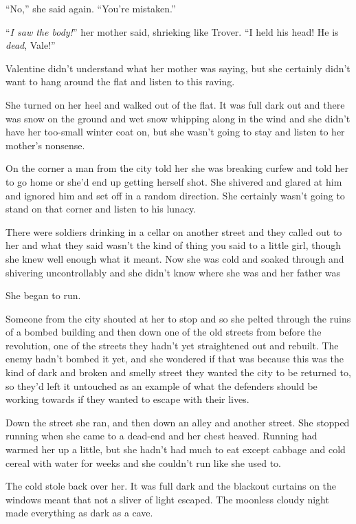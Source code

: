 “No,” she said again. “You’re mistaken.”

“\emph{I saw the body!}” her mother said, shrieking like Trover. “I
held his head! He is \emph{dead}, Vale!”

Valentine didn’t understand what her mother was saying, but she
certainly didn’t want to hang around the flat and listen to this
raving.

She turned on her heel and walked out of the flat. It was full dark
out and there was snow on the ground and wet snow whipping along in
the wind and she didn’t have her too-small winter coat on, but she
wasn’t going to stay and listen to her mother’s nonsense.

On the corner a man from the city told her she was breaking curfew
and told her to go home or she’d end up getting herself shot. She
shivered and glared at him and ignored him and set off in a random
direction. She certainly wasn’t going to stand on that corner and
listen to his lunacy.

There were soldiers drinking in a cellar on another street and they
called out to her and what they said wasn’t the kind of thing you
said to a little girl, though she knew well enough what it meant.
Now she was cold and soaked through and shivering uncontrollably
and she didn’t know where she was and her father was\dash{}

She began to run.

Someone from the city shouted at her to stop and so she pelted
through the ruins of a bombed building and then down one of the old
streets from before the revolution, one of the streets they hadn’t
yet straightened out and rebuilt. The enemy hadn’t bombed it yet,
and she wondered if that was because this was the kind of dark and
broken and smelly street they wanted the city to be returned to, so
they’d left it untouched as an example of what the defenders should
be working towards if they wanted to escape with their lives.

Down the street she ran, and then down an alley and another street.
She stopped running when she came to a dead-end and her chest
heaved. Running had warmed her up a little, but she hadn’t had much
to eat except cabbage and cold cereal with water for weeks and she
couldn’t run like she used to.

The cold stole back over her. It was full dark and the blackout
curtains on the windows meant that not a sliver of light escaped.
The moonless cloudy night made everything as dark as a cave.

